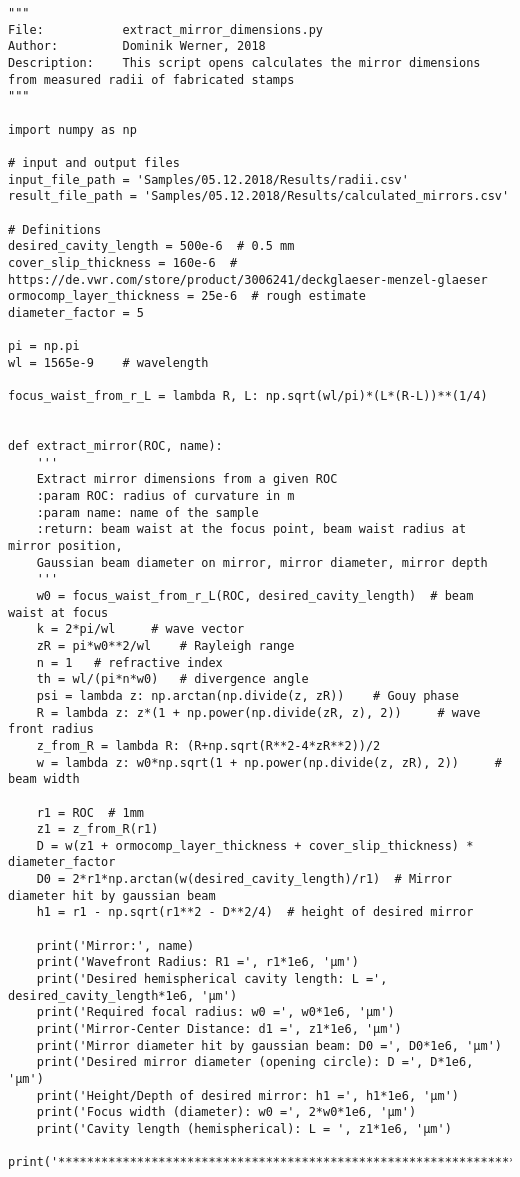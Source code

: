 \begin{lstlisting}
"""
File:           extract_mirror_dimensions.py
Author:         Dominik Werner, 2018
Description:    This script opens calculates the mirror dimensions from measured radii of fabricated stamps
"""

import numpy as np

# input and output files
input_file_path = 'Samples/05.12.2018/Results/radii.csv'
result_file_path = 'Samples/05.12.2018/Results/calculated_mirrors.csv'

# Definitions
desired_cavity_length = 500e-6  # 0.5 mm
cover_slip_thickness = 160e-6  # https://de.vwr.com/store/product/3006241/deckglaeser-menzel-glaeser
ormocomp_layer_thickness = 25e-6  # rough estimate
diameter_factor = 5

pi = np.pi
wl = 1565e-9    # wavelength

focus_waist_from_r_L = lambda R, L: np.sqrt(wl/pi)*(L*(R-L))**(1/4)


def extract_mirror(ROC, name):
    '''
    Extract mirror dimensions from a given ROC
    :param ROC: radius of curvature in m
    :param name: name of the sample
    :return: beam waist at the focus point, beam waist radius at mirror position,
    Gaussian beam diameter on mirror, mirror diameter, mirror depth
    '''
    w0 = focus_waist_from_r_L(ROC, desired_cavity_length)  # beam waist at focus
    k = 2*pi/wl     # wave vector
    zR = pi*w0**2/wl    # Rayleigh range
    n = 1   # refractive index
    th = wl/(pi*n*w0)   # divergence angle
    psi = lambda z: np.arctan(np.divide(z, zR))    # Gouy phase
    R = lambda z: z*(1 + np.power(np.divide(zR, z), 2))     # wave front radius
    z_from_R = lambda R: (R+np.sqrt(R**2-4*zR**2))/2
    w = lambda z: w0*np.sqrt(1 + np.power(np.divide(z, zR), 2))     # beam width

    r1 = ROC  # 1mm
    z1 = z_from_R(r1)
    D = w(z1 + ormocomp_layer_thickness + cover_slip_thickness) * diameter_factor
    D0 = 2*r1*np.arctan(w(desired_cavity_length)/r1)  # Mirror diameter hit by gaussian beam
    h1 = r1 - np.sqrt(r1**2 - D**2/4)  # height of desired mirror

    print('Mirror:', name)
    print('Wavefront Radius: R1 =', r1*1e6, 'µm')
    print('Desired hemispherical cavity length: L =', desired_cavity_length*1e6, 'µm')
    print('Required focal radius: w0 =', w0*1e6, 'µm')
    print('Mirror-Center Distance: d1 =', z1*1e6, 'µm')
    print('Mirror diameter hit by gaussian beam: D0 =', D0*1e6, 'µm')
    print('Desired mirror diameter (opening circle): D =', D*1e6, 'µm')
    print('Height/Depth of desired mirror: h1 =', h1*1e6, 'µm')
    print('Focus width (diameter): w0 =', 2*w0*1e6, 'µm')
    print('Cavity length (hemispherical): L = ', z1*1e6, 'µm')
    print('***************************************************************************************')


\end{lstlisting}
